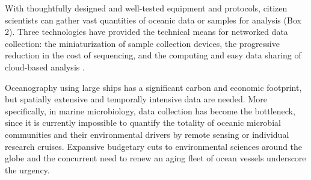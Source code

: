 With thoughtfully designed and well-tested equipment and protocols, citizen scientists can gather vast quantities of oceanic data or samples for analysis (Box 2). Three technologies have provided the technical means for networked data collection: the miniaturization of sample collection devices, the progressive reduction in the cost of sequencing, and the computing and easy data sharing of cloud-based analysis \cite{haklay2013citizen}.

Oceanography using large ships has a significant carbon and economic footprint, but spatially extensive and temporally intensive data are needed. More specifically, in marine microbiology, data collection has become the bottleneck, since it is currently impossible to quantify the totality of oceanic microbial communities and their environmental drivers by remote sensing or individual research cruises. Expansive budgetary cuts to environmental sciences around the globe and the concurrent need to renew an aging fleet of ocean vessels \cite{cressey2014us} underscore the urgency.